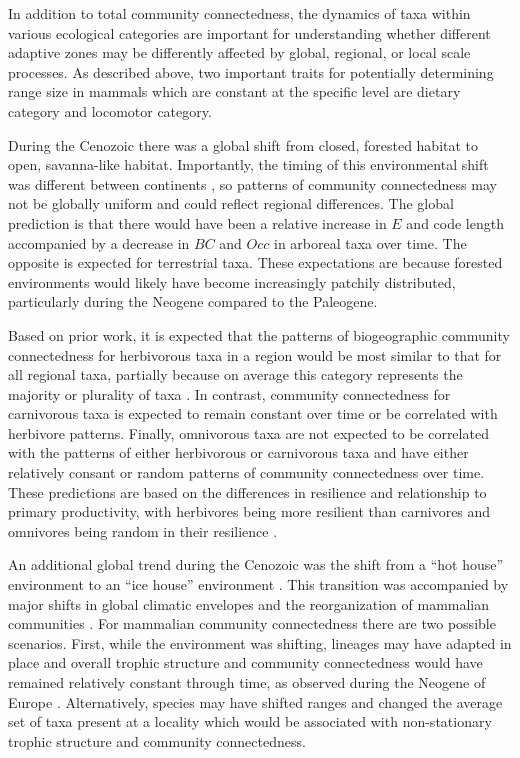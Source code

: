 \documentclass[12pt,letterpaper]{article}
\begin{document}
In addition to total community connectedness, the dynamics of taxa within various ecological categories are important for understanding whether different adaptive zones may be differently affected by global, regional, or local scale processes. As described above, two important traits for potentially determining range size in mammals which are constant at the specific level are dietary category and locomotor category. 

During the Cenozoic there was a global shift from closed, forested habitat to open, savanna-like habitat. Importantly, the timing of this environmental shift was different between continents \citep{Stromberg2005,Stromberg2013}, so patterns of community connectedness may not be globally uniform and could reflect regional differences. The global prediction is that there would have been a relative increase in \(E\) and code length accompanied by a decrease in \(BC\) and \(Occ\) in arboreal taxa over time. The opposite is expected for terrestrial taxa. These expectations are because forested environments would likely have become increasingly patchily distributed, particularly during the Neogene compared to the Paleogene.

Based on prior work, it is expected that the patterns of biogeographic community connectedness for herbivorous taxa in a region would be most similar to that for all regional taxa, partially because on average this category represents the majority or plurality of taxa \citep{Jernvall2002}. In contrast, community connectedness for carnivorous taxa is expected to remain constant over time or be correlated with herbivore patterns. Finally, omnivorous taxa are not expected to be correlated with the patterns of either herbivorous or carnivorous taxa and have either relatively consant or random patterns of community connectedness over time.  These predictions are based on the differences in resilience and relationship to primary productivity, with herbivores being more resilient than carnivores and omnivores being random in their resilience \citep{Jernvall2004}. 

An additional global trend during the Cenozoic was the shift from a ``hot house'' environment to an ``ice house'' environment \citep{Zachos2008,Zachos2001}. This transition was accompanied by major shifts in global climatic envelopes and the reorganization of mammalian communities \citep{Janis1993a,Fortelius2002,Blois2009,Alroy2000g,Figueirido2012}. For mammalian community connectedness there are two possible scenarios. First, while the environment was shifting, lineages may have adapted in place and overall trophic structure and community connectedness would have remained relatively constant through time, as observed during the Neogene of Europe \citep{Jernvall2004}. Alternatively, species may have shifted ranges and changed the average set of taxa present at a locality which would be associated with non-stationary trophic structure and community connectedness.
\end{document}
